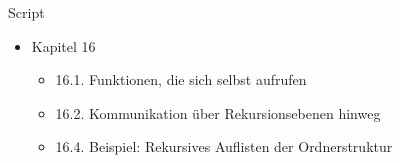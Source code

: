 
\begin{frame}[t,plain]
\titlepage
\end{frame}


\begin{frame}{Script}
%
\begin{itemize}
\item Kapitel 16
	\begin{itemize}
	\item 16.1. Funktionen, die sich selbst aufrufen
	\item 16.2. Kommunikation über Rekursionsebenen hinweg 
	\item 16.4. Beispiel: Rekursives Auflisten der Ordnerstruktur
	\end{itemize}
\end{itemize}
%
\end{frame}


